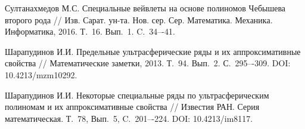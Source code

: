 \begin{thebibliography}{1}
Султанахмедов М.С. Специальные вейвлеты на основе полиномов Чебышева второго рода  //
Изв. Сарат. ун-та. Нов. сер. Сер. Математика. Механика. Информатика, 2016. Т.~16. Вып.~1. C.~34–-41.



 Шарапудинов И.И. Предельные ультрасферические ряды и их аппроксимативные свойства // Математические заметки, 2013. Т.~94. Вып.~2. С.~295–-309. DOI: 10.4213/mzm10292.



 Шарапудинов И.И. Некоторые специальные ряды по ультрасферическим полиномам и их аппроксимативные свойства // Известия РАН. Серия математическая. Т.~78,	Вып.~5,	C.~201–-224.  DOI: 10.4213/im8117.


\end{thebibliography}

